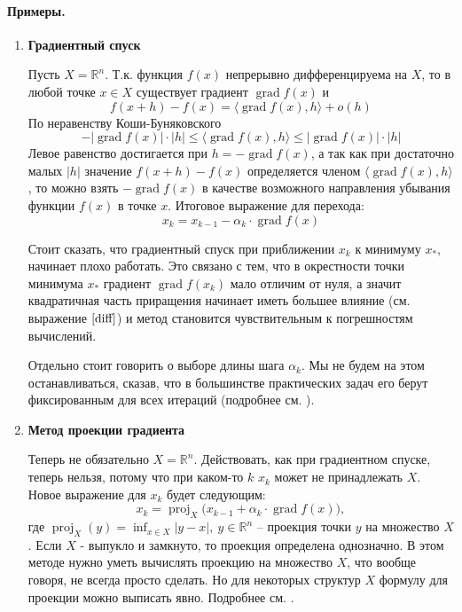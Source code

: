 \documentclass{article}
\theoremstyle{plain}
\theoremstyle{definition}
\DeclareMathOperator{\grad}{grad}
\DeclareMathOperator{\proj}{proj}
\begin{document}
\paragraph{Примеры.}
\begin{enumerate}
\item \textbf{Градиентный спуск}

Пусть $X = \mathbb{R}^n$. Т.к. функция $f(x)$ непрерывно дифференцируема на $X$, то в любой точке $x \in X$ существует градиент $\grad f(x)$ и
\begin{equation}
\label{diff}
f(x+h)-f(x)=\langle \grad f(x), h\rangle + o(h)
\end{equation}
По неравенству Коши-Буняковского
\begin{equation*}
\label{cauchey-bunyak}
-|\grad f(x)|\cdot |h|\leqslant\langle\grad f(x), h\rangle\leqslant |\grad f(x)|\cdot |h|
\end{equation*}
Левое равенство достигается при $h = -\grad f(x)$, а так как при достаточно малых $|h|$ значение $f(x+h)-f(x)$ определяется членом $\langle \grad f(x), h\rangle$, то можно взять $-\grad f(x)$ в качестве возможного направления убывания функции $f(x)$ в точке $x$. Итоговое выражение для перехода:
\begin{equation}
x_k = x_{k-1} - \alpha_k\cdot\grad f(x)
\end{equation}

Стоит сказать, что градиентный спуск при приближении $x_k$ к минимуму $x_*$, начинает плохо работать. Это связано с тем, что в окрестности точки минимума $x_*$ градиент $\grad f(x_k)$ мало отличим от нуля, а значит квадратичная часть приращения начинает иметь большее влияние (см. выражение $\eqref{diff}$) и метод становится чувствительным к погрешностям вычислений.

Отдельно стоит говорить о выборе длины шага $\alpha_k$. Мы не будем на этом останавливаться, сказав, что в большинстве практических задач его берут фиксированным для всех итераций (подробнее см. \cite[p.~276]{vasilyev}).

\item \textbf{Метод проекции градиента}

Теперь не обязательно $X = \mathbb{R}^n$. Действовать, как при градиентном спуске, теперь нельзя, потому что при каком-то $k$ $x_k$ может не принадлежать $X$. Новое выражение для $x_k$ будет следующим:
\begin{equation}
x_k = \proj_X \big(x_{k-1}+\alpha_k\cdot\grad f(x)\big),
\end{equation} где $\proj_X(y)=\inf_{x\in X} |y-x|,~y\in\mathbb{R}^n$ -- проекция точки $y$ на множество $X$. Если $X$ - выпукло и замкнуто, то проекция определена однозначно. В этом методе нужно уметь вычислять проекцию на множество $X$, что вообще говоря, не всегда просто сделать. Но для некоторых структур $X$ формулу для проекции можно выписать явно. Подробнее см. \cite[p.~293]{vasilyev}.
\end{enumerate}
\end{document}
